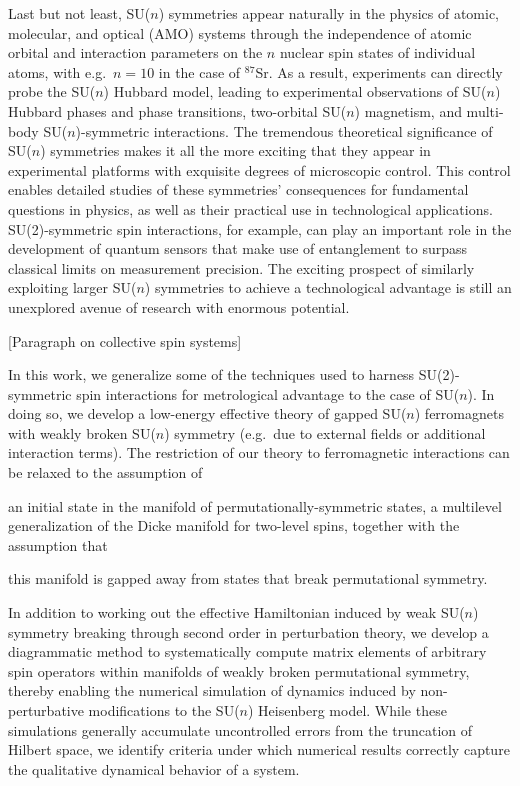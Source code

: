 \documentclass[nofootinbib,notitlepage,11pt]{revtex4-2}
\newcommand{\1}{\mathds{1}}
\newcommand{\red}[1]{{\color{red} #1}}
\begin{document}
Last but not least, SU($n$) symmetries appear naturally in the physics
of atomic, molecular, and optical (AMO)
systems\cite{gorshkov2010twoorbital, beverland2016realizing,
  cazalilla2014ultracold, taie2012su, hofrichter2016direct,
  cappellini2014direct, scazza2014observation, zhang2014spectroscopic,
  goban2018emergence, perlin2019effective} through the independence of
atomic orbital and interaction parameters on the $n$ nuclear spin
states of individual atoms, with e.g.~$n=10$ in the case of
${}^{87}$Sr.  As a result, experiments can directly probe the SU($n$)
Hubbard model, leading to experimental observations of SU($n$) Hubbard
phases and phase transitions\cite{taie2012su, hofrichter2016direct},
two-orbital SU($n$) magnetism\cite{cappellini2014direct,
  scazza2014observation, zhang2014spectroscopic}, and multi-body
SU($n$)-symmetric interactions\cite{goban2018emergence,
  perlin2019effective}.  The tremendous theoretical significance of
SU($n$) symmetries makes it all the more exciting that they appear in
experimental platforms with exquisite degrees of microscopic control.
This control enables detailed studies of these symmetries'
consequences for fundamental questions in physics, as well as their
practical use in technological applications.  SU(2)-symmetric spin
interactions, for example, can play an important role in the
development of quantum sensors that make use of entanglement to
surpass classical limits on measurement
precision\cite{he2019engineering, perlin2020spin}.
The exciting prospect of similarly exploiting larger SU($n$)
symmetries to achieve a technological advantage is still an unexplored
avenue of research with enormous potential.

\red{[Paragraph on collective spin systems]}

In this work, we generalize some of the techniques used to harness
SU(2)-symmetric spin interactions for metrological advantage to the
case of SU($n$).  In doing so, we develop a low-energy effective
theory of gapped SU($n$) ferromagnets with weakly broken SU($n$)
symmetry (e.g.~due to external fields or additional interaction
terms).  The restriction of our theory to ferromagnetic interactions
can be relaxed to the assumption of
\begin{enumerate*}
\item an initial state in the manifold of permutationally-symmetric
  states, a multilevel generalization of the Dicke manifold for
  two-level spins, together with the assumption that
\item this manifold is gapped away from states that break
  permutational symmetry.
\end{enumerate*}
In addition to working out the effective Hamiltonian induced by weak
SU($n$) symmetry breaking through second order in perturbation theory,
we develop a diagrammatic method to systematically compute matrix
elements of arbitrary spin operators within manifolds of weakly broken
permutational symmetry, thereby enabling the numerical simulation of
dynamics induced by non-perturbative modifications to the SU($n$)
Heisenberg model.  While these simulations generally accumulate
uncontrolled errors from the truncation of Hilbert space, we identify
criteria under which numerical results correctly capture the
qualitative dynamical behavior of a system.
\end{document}
